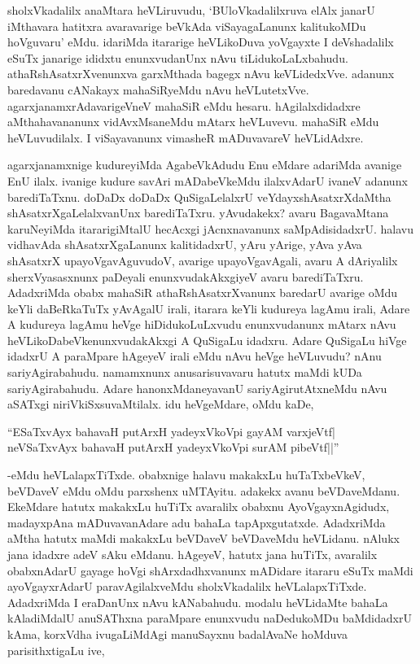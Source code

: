 sholxVkadalilx anaMtara heVLiruvudu, `BUloVkadalilxruva elAlx janarU iMthavara hatitxra avaravarige beVkAda viSayagaLanunx kalitukoMDu hoVguvaru' eMdu. idariMda itararige heVLikoDuva yoVgayxte I deVshadalilx eSuTx janarige ididxtu enunxvudanUnx nAvu tiLidukoLaLxbahudu. athaRshAsatxrXvenunxva garxMthada bagegx nAvu keVLidedxVve. adanunx baredavanu cANakayx mahaSiRyeMdu nAvu heVLutetxVve. agarxjanamxrAdavarigeVneV mahaSiR eMdu hesaru. hAgilalxdidadxre aMthahavananunx vidAvxMsaneMdu mAtarx heVLuvevu. mahaSiR eMdu heVLuvudilalx. I viSayavanunx vimasheR mADuvavareV heVLidAdxre.

agarxjanamxnige kudureyiMda AgabeVkAdudu Enu eMdare adariMda avanige EnU ilalx. ivanige kudure savAri mADabeVkeMdu ilalxvAdarU ivaneV adanunx barediTaTxnu. doDaDx doDaDx QuSigaLelalxrU veYdayxshAsatxrXdaMtha shAsatxrXgaLelalxvanUnx barediTaTxru. yAvudakekx? avaru BagavaMtana karuNeyiMda itararigiMtalU hecAcxgi jAcnxnavanunx saMpAdisidadxrU. halavu vidhavAda shAsatxrXgaLanunx kalitidadxrU, yAru yArige, yAva yAva shAsatxrX upayoVgavAguvudoV, avarige upayoVgavAgali, avaru A dAriyalilx sherxVyasasxnunx paDeyali enunxvudakAkxgiyeV avaru barediTaTxru. AdadxriMda obabx mahaSiR athaRshAsatxrXvanunx baredarU avarige oMdu keYli daBeRkaTuTx yAvAgalU irali, itarara keYli kudureya lagAmu irali, Adare A kudureya lagAmu heVge hiDidukoLuLxvudu enunxvudanunx mAtarx nAvu heVLikoDabeVkenunxvudakAkxgi A QuSigaLu idadxru. Adare QuSigaLu hiVge idadxrU A paraMpare hAgeyeV irali eMdu nAvu heVge heVLuvudu? nAnu sariyAgirabahudu. namamxnunx anusarisuvavaru hatutx maMdi kUDa sariyAgirabahudu. Adare hanonxMdaneyavanU sariyAgirutAtxneMdu nAvu aSATxgi niriVkiSxsuvaMtilalx. idu heVgeMdare, oMdu kaDe, 

\begin{shloka}
``ESaTxvAyx bahavaH putArxH yadeyxVkoV\s pi gayAM varxjeVtf|\\
neVSaTxvAyx bahavaH putArxH yadeyxVkoV\s pi surAM pibeVtf||''
\end{shloka}

-eMdu heVLalapxTiTxde. obabxnige halavu makakxLu huTaTxbeVkeV, beVDaveV eMdu oMdu parxshenx uMTAyitu. adakekx avanu beVDaveMdanu. EkeMdare hatutx makakxLu huTiTx avaralilx obabxnu AyoVgayxnAgidudx, madayxpAna mADuvavanAdare adu bahaLa tapApxgutatxde. AdadxriMda aMtha hatutx maMdi makakxLu beVDaveV beVDaveMdu heVLidanu. nAlukx jana idadxre adeV sAku eMdanu. hAgeyeV, hatutx jana huTiTx, avaralilx obabxnAdarU gayage hoVgi shArxdadhxvanunx mADidare itararu eSuTx maMdi ayoVgayxrAdarU paravAgilalxveMdu sholxVkadalilx heVLalapxTiTxde. AdadxriMda I eraDanUnx nAvu kANabahudu. modalu heVLidaMte bahaLa kAladiMdalU anuSAThxna paraMpare enunxvudu naDedukoMDu baMdidadxrU kAma, korxVdha ivugaLiMdAgi manuSayxnu badalAvaNe hoMduva parisithxtigaLu ive,

